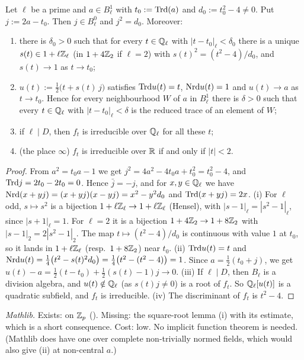 \begin{lemma}\label{lem:s02-sa-step-c}
Let $\ell$ be a prime and $a\in B^1_\ell$ with $t_0:=\mathrm{Trd}(a)$ and $d_0:=t_0^2-4\ne0$. Put $j:=2a-t_0$. Then $j\in B_\ell^0$ and
$j^2=d_0$. Moreover:
\begin{enumerate}[label=(\roman*)]
\item there is $\delta_0>0$ such that for every $t\in\mathbb{Q}_\ell$ with $|t-t_0|_\ell<\delta_0$ there is a unique
  $s(t)\in1+\ell\mathbb{Z}_\ell$ (in $1+4\mathbb{Z}_2$ if $\ell=2$) with $s(t)^2=(t^2-4)/d_0$, and $s(t)\to1$ as $t\to t_0$;
\item $u(t):=\tfrac12\big(t+s(t)\,j\big)$ satisfies $\mathrm{Trd} u(t)=t$, $\mathrm{Nrd} u(t)=1$ and $u(t)\to a$ as $t\to t_0$. Hence for
  every neighbourhood $W$ of $a$ in $B^1_\ell$ there is $\delta>0$ such that every $t\in\mathbb{Q}_\ell$ with $|t-t_0|_\ell<\delta$ is
  the reduced trace of an element of $W$;
\item if $\ell\mid D$, then $f_t$ is irreducible over $\mathbb{Q}_\ell$ for all these $t$;
\item (the place $\infty$) $f_t$ is irreducible over $\mathbb{R}$ if and only if $|t|<2$.
\end{enumerate}
\stproved{}
\end{lemma}

\begin{proof}
From $a^2=t_0a-1$ we get $j^2=4a^2-4t_0a+t_0^2=t_0^2-4$, and $\mathrm{Trd} j=2t_0-2t_0=0$. Hence $\bar j=-j$, and for
$x,y\in\mathbb{Q}_\ell$ we have $\mathrm{Nrd}(x+yj)=(x+yj)(x-yj)=x^2-y^2d_0$ and $\mathrm{Trd}(x+yj)=2x$.
(i) For $\ell$ odd, $s\mapsto s^2$ is a bijection $1+\ell\mathbb{Z}_\ell\to1+\ell\mathbb{Z}_\ell$ (Hensel), with $|s-1|_\ell=|s^2-1|_\ell$,
since $|s+1|_\ell=1$. For $\ell=2$ it is a bijection $1+4\mathbb{Z}_2\to1+8\mathbb{Z}_2$ with $|s-1|_2=2|s^2-1|_2$. The map
$t\mapsto(t^2-4)/d_0$ is continuous with value $1$ at $t_0$, so it lands in $1+\ell\mathbb{Z}_\ell$ (resp.\ $1+8\mathbb{Z}_2$) near $t_0$.
(ii) $\mathrm{Trd} u(t)=t$ and $\mathrm{Nrd} u(t)=\frac14\big(t^2-s(t)^2d_0\big)=\frac14\big(t^2-(t^2-4)\big)=1$. Since $a=\frac12(t_0+j)$,
we get $u(t)-a=\frac12(t-t_0)+\frac12(s(t)-1)j\to0$.
(iii) If $\ell\mid D$, then $B_\ell$ is a division algebra, and $u(t)\notin\mathbb{Q}_\ell$ (as $s(t)j\ne0$) is a root of $f_t$. So
$\mathbb{Q}_\ell[u(t)]$ is a quadratic subfield, and $f_t$ is irreducible.
(iv) The discriminant of $f_t$ is $t^2-4$.
\end{proof}

\noindent\emph{Mathlib.} Exists:  on $\mathbb{Z}_p$ (). Missing: the
square-root lemma (i) with its estimate, which is a short consequence. Cost: low. No implicit function theorem is needed. (Mathlib
does have one over complete non-trivially normed fields, which would also give (ii) at non-central $a$.)

